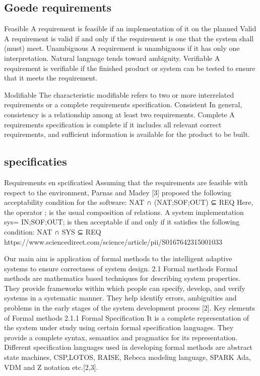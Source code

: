 \documentclass{article}
\begin{document}
		\subsection{Goede requirements}
		
		Feasible
		A requirement is feasible if an implementation of it on the planned
		Valid
		A requirement is valid if and only if the requirement is one that the
		system shall (must) meet.
		Unambiguous
		A requirement is unambiguous if it has only one interpretation. Natural
		language tends toward ambiguity.
		Verifiable
		A requirement is verifiable if the finished product or system can be
		tested to ensure that it meets the requirement.
		
		Modifiable
		The characteristic modifiable refers to two or more interrelated
		requirements or a complete requirements specification.
		Consistent
		In general, consistency is a relationship among at least two
		requirements.
		Complete
		A requirements specification is complete if it includes all relevant
		correct requirements, and sufficient information is available for the
		product to be built.
		
	\subsection{specificaties}

		Requirements en spcificatiesl Assuming that the requirements are feasible with respect to the
	environment, Parnas and Madey [3] proposed the following acceptability condition for the software: NAT
	∩ (NAT;SOF;OUT) ⊆ REQ
	Here, the operator ; is the usual composition of relations.
	A system implementation sys= IN;SOF;OUT; is then acceptable if and only if it satisfies the following
	condition: NAT ∩ SYS ⊆ REQ
	https://www.sciencedirect.com/science/article/pii/S0167642315001033
	
	
	Our main aim is application of formal methods to the intelligent adaptive systems to ensure correctness of system design.
	2.1 Formal methods
	Formal methods are mathematics based techniques for describing system properties. They provide frameworks within which people can specify, develop, and verify systems in a systematic manner. They help identify errors, ambiguities and problems in the early stages of the system development process [2].
	Key elements of Formal methods
	2.1.1 Formal Specification
	It is a complete representation of the system under study using certain formal specification languages. They provide a complete syntax, semantics and pragmatics for its representation. Different specification languages used in developing formal methods are abstract state machines, CSP,LOTOS, RAISE, Rebeca modeling language, SPARK Ada, VDM and Z notation etc.[2,3].
	
\end{document}
